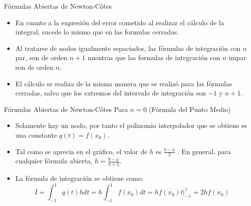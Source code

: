 \documentclass[12pt]{beamer}
\begin{document}
\begin{frame}{F\'ormulas Abiertas de Newton-C\^otes}
  \begin{itemize}
    \item En cuanto a la expresión del error cometido al realizar el cálculo de la integral, sucede lo mismo que en las
    formulas cerradas.
    \item Al tratarse de nodos igualmente espaciados, las fórmulas de integración con $n$ par, son de orden $n+1$ mientras que las formulas de integración con $n$ impar son de orden $n$.
    \item El cálculo se realiza de la
    misma manera que se realizó para las fórmulas cerradas, salvo que los extremos del intervalo de integración
    son $-1$ y $n+1$.
    \end{itemize}
\end{frame}
\begin{frame}{F\'ormulas Abiertas de Newton-C\^otes}
  Para $n=0$ (F\'ormula del Punto Medio)
  \begin{center}
  \end{center}
  \begin{itemize}
    \item Solamente hay un nodo, por tanto el polinomio interpolador que se obtiene es una constante $q(t) = f (x_0)$.
    \item<2-> Tal como se aprecia en el gráfico, el valor de $h$ es $\frac{b-a}{2}$
    . En general, para cualquier fórmula abierta, $h=\frac{b-a}{n+2}$.
    \item<3->La fórmula de integración se obtiene como:
    $$
    I = \int_{-1}^{1}q(t)hdt = h\int_{-1}^{1}f(x_0)dt = \left.hf(x_0)t\right|_{-1}^1 = 2hf(x_0)
    $$    
  \end{itemize}
\end{frame}
\end{document}
